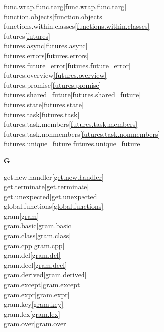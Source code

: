 \begin{multicols}{2}
func.wrap.func.targ\quad\ref{func.wrap.func.targ}\\
function.objects\quad\ref{function.objects}\\
functions.within.classes\quad\ref{functions.within.classes}\\
futures\quad\ref{futures}\\
futures.async\quad\ref{futures.async}\\
futures.errors\quad\ref{futures.errors}\\
futures.future_error\quad\ref{futures.future_error}\\
futures.overview\quad\ref{futures.overview}\\
futures.promise\quad\ref{futures.promise}\\
futures.shared_future\quad\ref{futures.shared_future}\\
futures.state\quad\ref{futures.state}\\
futures.task\quad\ref{futures.task}\\
futures.task.members\quad\ref{futures.task.members}\\
futures.task.nonmembers\quad\ref{futures.task.nonmembers}\\
futures.unique_future\quad\ref{futures.unique_future}\\
\par \textbf{G}\par
get.new.handler\quad\ref{get.new.handler}\\
get.terminate\quad\ref{get.terminate}\\
get.unexpected\quad\ref{get.unexpected}\\
global.functions\quad\ref{global.functions}\\
gram\quad\ref{gram}\\
gram.basic\quad\ref{gram.basic}\\
gram.class\quad\ref{gram.class}\\
gram.cpp\quad\ref{gram.cpp}\\
gram.dcl\quad\ref{gram.dcl}\\
gram.decl\quad\ref{gram.decl}\\
gram.derived\quad\ref{gram.derived}\\
gram.except\quad\ref{gram.except}\\
gram.expr\quad\ref{gram.expr}\\
gram.key\quad\ref{gram.key}\\
gram.lex\quad\ref{gram.lex}\\
gram.over\quad\ref{gram.over}\\

\end{multicols}
